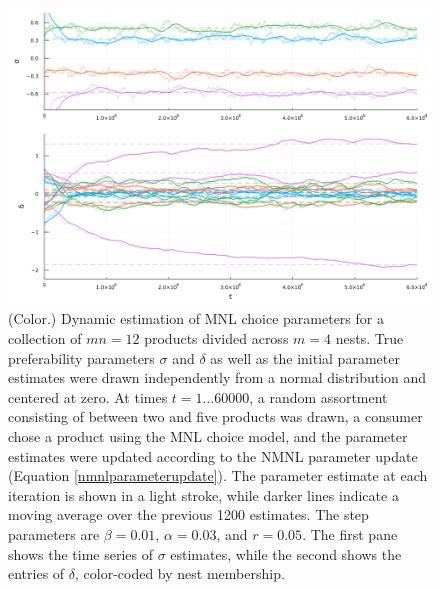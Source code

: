 \documentclass[preprint,12pt,authoryear]{elsarticle}
\begin{document}
\begin{figure}
\begin{center}\includegraphics[width=\linewidth, ]{../plots/param-est-dynamic-nested.png}\end{center}
\captionsetup{singlelinecheck=off}
    \caption[.]{(Color.) Dynamic estimation of MNL choice parameters for a collection of $mn = 12$ products divided across $m=4$ nests. True preferability parameters $\sigma$ and $\delta$ as well as the initial parameter estimates were drawn independently from a normal distribution and centered at zero. At times $t = 1 \dots 60000$, a random assortment consisting of between two and five products was drawn, a consumer chose a product using the MNL choice model, and the parameter estimates were updated according to the NMNL parameter update (Equation \ref{nmnlparameterupdate}). The parameter estimate at each iteration is shown in a light stroke, while darker lines indicate a moving average over the previous 1200 estimates. The step parameters are $\beta = 0.01$, $\alpha = 0.03$, and $r = 0.05$. The first pane shows the time series of $\sigma$ estimates, while the second shows the entries of $\delta$, color-coded by nest membership.}
\label{param-est-dynamic-nested}
\end{figure}
\end{document}
